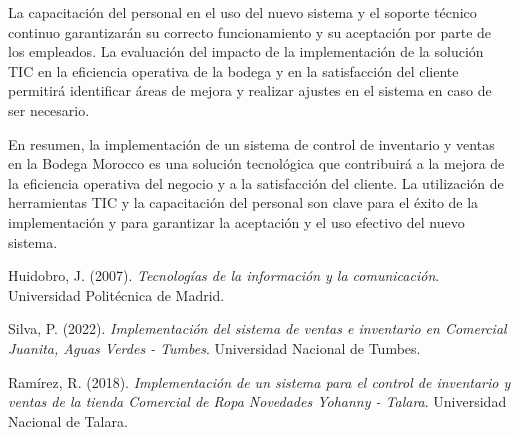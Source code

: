 \documentclass{article}
\begin{document}
  La capacitación del personal en el uso del nuevo sistema y el soporte técnico continuo garantizarán su correcto funcionamiento y su aceptación por parte de los empleados. La evaluación del impacto de la implementación de la solución TIC en la eficiencia operativa de la bodega y en la satisfacción del cliente permitirá identificar áreas de mejora y realizar ajustes en el sistema en caso de ser necesario.

  En resumen, la implementación de un sistema de control de inventario y ventas en la Bodega Morocco es una solución tecnológica que contribuirá a la mejora de la eficiencia operativa del negocio y a la satisfacción del cliente. La utilización de herramientas TIC y la capacitación del personal son clave para el éxito de la implementación y para garantizar la aceptación y el uso efectivo del nuevo sistema.

  \begin{thebibliography}{}

    Huidobro, J. (2007). \textit{Tecnologías de la información y la comunicación}. Universidad Politécnica de Madrid.
    
    Silva, P. (2022). \textit{Implementación del sistema de ventas e inventario en Comercial Juanita, Aguas Verdes - Tumbes}. Universidad Nacional de Tumbes.
    
    Ramírez, R. (2018). \textit{Implementación de un sistema para el control de inventario y ventas de la tienda Comercial de Ropa Novedades Yohanny - Talara}. Universidad Nacional de Talara.
    
    \end{thebibliography}
    
\end{document}
